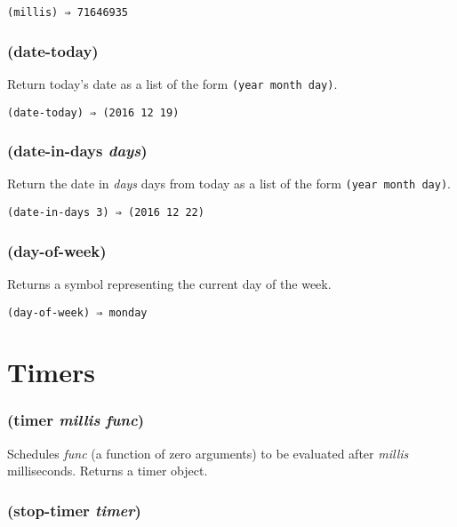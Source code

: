 \documentclass{article}
\begin{document}
\begin{verbatim}
(millis) ⇒ 71646935
\end{verbatim}

\subsubsection{(date-today)}
\label{sec:date-today}

Return today's date as a list of the form \verb|(year month day)|.

\begin{verbatim}
(date-today) ⇒ (2016 12 19)
\end{verbatim}

\subsubsection{(date-in-days \emph{days})}
\label{sec:date-in-days}

Return the date in \emph{days} days from today as a list of the form \verb|(year month day)|.

\begin{verbatim}
(date-in-days 3) ⇒ (2016 12 22)
\end{verbatim}

\subsubsection{(day-of-week)}
\label{sec:day-of-week}

Returns a symbol representing the current day of the week.

\begin{verbatim}
(day-of-week) ⇒ monday
\end{verbatim}

\section{Timers}\label{sec:timers}

\subsubsection{(timer \emph{millis} \emph{func})}

Schedules \emph{func} (a function of zero arguments) to be evaluated after \emph{millis}
milliseconds. Returns a timer object.

\subsubsection{(stop-timer \emph{timer})}
\end{document}
